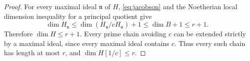 \begin{proof}
For every maximal ideal $\mathfrak n$ of $H$,
\eqref{eq:jacobson} and the Noetherian local dimension inequality
for a principal quotient give
\[
 \dim H_{\mathfrak n}
 \le\dim(H_{\mathfrak n}/cH_{\mathfrak n})+1
 \le\dim B+1\le r+1.
\]
Therefore $\dim H\le r+1$. Every prime chain avoiding $c$ can
be extended strictly by a maximal ideal, since every maximal ideal
contains $c$. Thus every such chain has length at most $r$, and
\mbox{$\dim H[1/c]\le r$}.
\end{proof}
